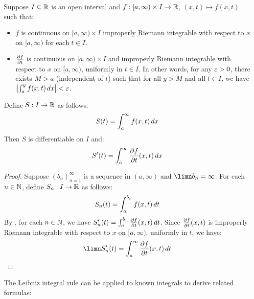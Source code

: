\documentclass[main.tex]{subfiles}
\begin{document}
\begin{theorem}\label{leibniz_integral_rule_improper_riemann_integral}
    Suppose $I\sub\R$ is an open interval and $f:[a,\infty)\times I\to\R$, $(x,t)\mapsto f(x,t)$ such that:
    \begin{itemize}
        \item $f$ is continuous on $[a,\infty)\times I$ improperly Riemann integrable with respect to $x$ on $[a,\infty)$ for each $t\in I$.
        \item $\pdv{f}{t}$ is continuous on $[a,\infty)\times I$ and improperly Riemann integrable with respect to $x$ on $[a,\infty)$, uniformly in $t\in I$. In other words, for any $\varepsilon>0$, there exists $M>a$ (independent of $t$) such that for all $y>M$ and all $t\in I$, we have $\abs{\int_a^y f(x,t)\,dx}<\varepsilon$.
    \end{itemize}
    Define $S:I\to\R$ as follows:
    \begin{equation*}
        S(t) = \int_a^\infty f(x,t)\,dx
    \end{equation*}
    Then $S$ is differentiable on $I$ and:
    \begin{equation*}
        S'(t) = \int_a^\infty \pdv{f}{t}\/(x,t)\,dx
    \end{equation*}
\end{theorem}
\begin{proof}
    Suppose $(b_n)_{n=1}^\infty$ is a sequence in $(a,\infty)$ and $\limn b_n=\infty$. For each $n\in\N$, define $S_n:I\to\R$ as follows:
    \begin{equation*}
        S_n(t) = \int_a^{b_n} f(x,t)\,dt
    \end{equation*}
    By , for each $n\in\N$, we have $S_n'(t)=\int_a^{b_n} \pdv{f}{t}\/(x,t)\,dt$. Since $\pdv{f}{t}\/(x,t)$ is improperly Riemann integrable with respect to $x$ on $[a,\infty)$, uniformly in $t$, we have:
    \begin{equation*}
        \limn S_n'(t) = \int_a^\infty \pdv{f}{t}\/(x,t)\dt
    \end{equation*}
\end{proof}

The Leibniz integral rule can be applied to known integrals to derive related formulas:

\newcommand*{\diffarrowquad}[1][a]{\quad\xrightarrow{\hspace{1ex}\tfrac{d}{da}\hspace{1ex}}\quad}
\end{document}
